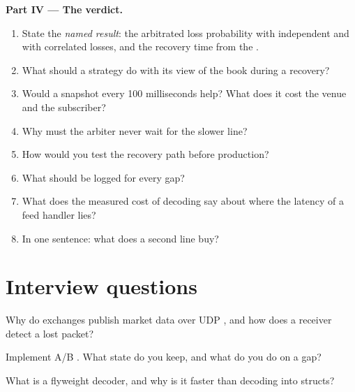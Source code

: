 \begin{problem}
\medskip\noindent\textbf{Part IV --- The verdict.}
\begin{enumerate}[resume]
\item State the \emph{named result}: the arbitrated loss probability with independent and with correlated losses, and the
recovery time from the .
\item What should a strategy do with its view of the book during a recovery?
\item Would a snapshot every 100 milliseconds help? What does it cost the venue and the subscriber?
\item Why must the arbiter never wait for the slower line?
\item How would you test the recovery path before production?
\item What should be logged for every gap?
\item What does the measured cost of decoding say about where the latency of a feed handler lies?
\item In one sentence: what does a second line buy?
\end{enumerate}
\end{problem}

\section{Interview questions}

\begin{interviewq}\label{iq:ll:protocols-ii-binary-exchange-protocols:1}
Why do exchanges publish market data over UDP , and how does a receiver detect a lost packet?
\end{interviewq}

\begin{interviewq}\label{iq:ll:protocols-ii-binary-exchange-protocols:2}
Implement A/B . What state do you keep, and what do you do on a gap?
\end{interviewq}

\begin{interviewq}\label{iq:ll:protocols-ii-binary-exchange-protocols:3}
What is a flyweight decoder, and why is it faster than decoding into structs?
\end{interviewq}

